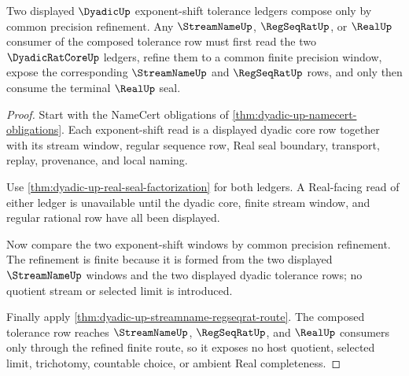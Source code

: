 \begin{theorem}
\label{thm:dyadic-exponent-shift-composition}
Two displayed $\DyadicUp$ exponent-shift tolerance ledgers compose only by common precision refinement. Any $\StreamNameUp$, $\RegSeqRatUp$, or $\RealUp$ consumer of the composed tolerance row must first read the two $\DyadicRatCoreUp$ ledgers, refine them to a common finite precision window, expose the corresponding $\StreamNameUp$ and $\RegSeqRatUp$ rows, and only then consume the terminal $\RealUp$ seal.
\end{theorem}
\begin{proof}
Start with the NameCert obligations of \autoref{thm:dyadic-up-namecert-obligations}. Each exponent-shift read is a displayed dyadic core row together with its stream window, regular sequence row, Real seal boundary, transport, replay, provenance, and local naming.

Use \autoref{thm:dyadic-up-real-seal-factorization} for both ledgers. A Real-facing read of either ledger is unavailable until the dyadic core, finite stream window, and regular rational row have all been displayed.

Now compare the two exponent-shift windows by common precision refinement. The refinement is finite because it is formed from the two displayed $\StreamNameUp$ windows and the two displayed dyadic tolerance rows; no quotient stream or selected limit is introduced.

Finally apply \autoref{thm:dyadic-up-streamname-regseqrat-route}. The composed tolerance row reaches $\StreamNameUp$, $\RegSeqRatUp$, and $\RealUp$ consumers only through the refined finite route, so it exposes no host quotient, selected limit, trichotomy, countable choice, or ambient Real completeness.
\end{proof}

